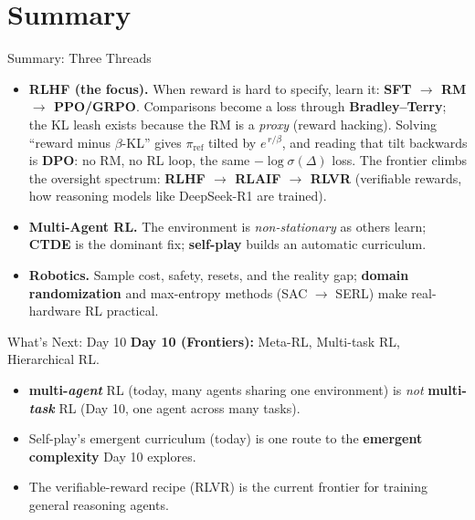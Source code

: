 \section{Summary}

\begin{frame}{Summary: Three Threads}
\begin{itemize}\itemsep0.45em
    \item \textbf{RLHF (the focus).} When reward is hard to specify, learn it:
          \textbf{SFT $\rightarrow$ RM $\rightarrow$ PPO/GRPO}. Comparisons become a
          loss through \textbf{Bradley--Terry}; the KL leash exists because the RM is
          a \emph{proxy} (reward hacking). Solving ``reward minus $\beta$-KL'' gives
          $\pi_{\text{ref}}$ tilted by $e^{\,r/\beta}$, and reading that tilt
          backwards is \textbf{DPO}: no RM, no RL loop, the same
          $-\log\sigma(\Delta)$ loss. The frontier climbs the oversight spectrum:
          \textbf{RLHF $\rightarrow$ RLAIF $\rightarrow$ RLVR} (verifiable rewards,
          how reasoning models like DeepSeek-R1 are trained).
    \item \textbf{Multi-Agent RL.} The environment is \emph{non-stationary} as
          others learn; \textbf{CTDE} is the dominant fix; \textbf{self-play}
          builds an automatic curriculum.
    \item \textbf{Robotics.} Sample cost, safety, resets, and the reality gap;
          \textbf{domain randomization} and max-entropy methods (SAC $\to$ SERL)
          make real-hardware RL practical.
\end{itemize}
\end{frame}

\begin{frame}{What's Next: Day 10}
\textbf{Day 10 (Frontiers):} Meta-RL, Multi-task RL, Hierarchical RL.
\begin{itemize}\itemsep0.4em
    \item {} \textbf{multi-\emph{agent}} RL (today, many
          agents sharing one environment) is \emph{not} \textbf{multi-\emph{task}}
          RL (Day 10, one agent across many tasks).
    \item Self-play's emergent curriculum (today) is one route to the
          \textbf{emergent complexity} Day 10 explores.
    \item The verifiable-reward recipe (RLVR) is the current frontier for training
          general reasoning agents.
\end{itemize}
\end{frame}
